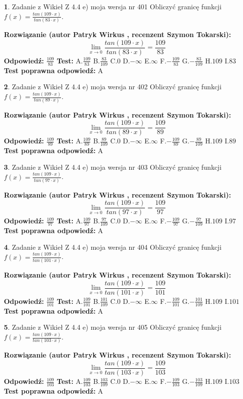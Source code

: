 \documentclass[12pt, a4paper]{article}
\theoremstyle{definition} %
\newtheorem{zad}{}
\newcommand{\zadStart}[1]{\begin{zad}#1\newline}
\newcommand{\zadStop}{\end{zad}}
\newcommand{\rozwStart}[2]{\noindent \textbf{Rozwiązanie (autor #1 , recenzent #2): }\newline}
\newcommand{\rozwStop}{\newline}
\newcommand{\odpStart}{\noindent \textbf{Odpowiedź:}\newline}
\newcommand{\odpStop}{\newline}
\newcommand{\testStart}{\noindent \textbf{Test:}\newline}
\newcommand{\testStop}{\newline}
\newcommand{\kluczStart}{\noindent \textbf{Test poprawna odpowiedź:}\newline}
\newcommand{\kluczStop}{\newline}
\begin{document}
\zadStart{Zadanie z Wikieł Z 4.4 e) moja wersja nr 401}
Obliczyć granicę funkcji $f(x)=\frac{tan(109\cdot x)}{tan(83\cdot x)}$.
\zadStop
\rozwStart{Patryk Wirkus}{Szymon Tokarski}
$$\lim\limits_{x\to 0}\frac{tan(109\cdot x)}{tan(83\cdot x)}=
\frac{109}{83}$$
\rozwStop
\odpStart
$\frac{109}{83}$
\odpStop
\testStart
A.$\frac{109}{83}$
B.$\frac{83}{109}$
C.$0$
D.$-\infty$
E.$\infty$
F.$-\frac{109}{83}$
G.$-\frac{83}{109}$
H.$109$
I.$83$
\testStop
\kluczStart
A
\kluczStop



\zadStart{Zadanie z Wikieł Z 4.4 e) moja wersja nr 402}
Obliczyć granicę funkcji $f(x)=\frac{tan(109\cdot x)}{tan(89\cdot x)}$.
\zadStop
\rozwStart{Patryk Wirkus}{Szymon Tokarski}
$$\lim\limits_{x\to 0}\frac{tan(109\cdot x)}{tan(89\cdot x)}=
\frac{109}{89}$$
\rozwStop
\odpStart
$\frac{109}{89}$
\odpStop
\testStart
A.$\frac{109}{89}$
B.$\frac{89}{109}$
C.$0$
D.$-\infty$
E.$\infty$
F.$-\frac{109}{89}$
G.$-\frac{89}{109}$
H.$109$
I.$89$
\testStop
\kluczStart
A
\kluczStop



\zadStart{Zadanie z Wikieł Z 4.4 e) moja wersja nr 403}
Obliczyć granicę funkcji $f(x)=\frac{tan(109\cdot x)}{tan(97\cdot x)}$.
\zadStop
\rozwStart{Patryk Wirkus}{Szymon Tokarski}
$$\lim\limits_{x\to 0}\frac{tan(109\cdot x)}{tan(97\cdot x)}=
\frac{109}{97}$$
\rozwStop
\odpStart
$\frac{109}{97}$
\odpStop
\testStart
A.$\frac{109}{97}$
B.$\frac{97}{109}$
C.$0$
D.$-\infty$
E.$\infty$
F.$-\frac{109}{97}$
G.$-\frac{97}{109}$
H.$109$
I.$97$
\testStop
\kluczStart
A
\kluczStop



\zadStart{Zadanie z Wikieł Z 4.4 e) moja wersja nr 404}
Obliczyć granicę funkcji $f(x)=\frac{tan(109\cdot x)}{tan(101\cdot x)}$.
\zadStop
\rozwStart{Patryk Wirkus}{Szymon Tokarski}
$$\lim\limits_{x\to 0}\frac{tan(109\cdot x)}{tan(101\cdot x)}=
\frac{109}{101}$$
\rozwStop
\odpStart
$\frac{109}{101}$
\odpStop
\testStart
A.$\frac{109}{101}$
B.$\frac{101}{109}$
C.$0$
D.$-\infty$
E.$\infty$
F.$-\frac{109}{101}$
G.$-\frac{101}{109}$
H.$109$
I.$101$
\testStop
\kluczStart
A
\kluczStop



\zadStart{Zadanie z Wikieł Z 4.4 e) moja wersja nr 405}
Obliczyć granicę funkcji $f(x)=\frac{tan(109\cdot x)}{tan(103\cdot x)}$.
\zadStop
\rozwStart{Patryk Wirkus}{Szymon Tokarski}
$$\lim\limits_{x\to 0}\frac{tan(109\cdot x)}{tan(103\cdot x)}=
\frac{109}{103}$$
\rozwStop
\odpStart
$\frac{109}{103}$
\odpStop
\testStart
A.$\frac{109}{103}$
B.$\frac{103}{109}$
C.$0$
D.$-\infty$
E.$\infty$
F.$-\frac{109}{103}$
G.$-\frac{103}{109}$
H.$109$
I.$103$
\testStop
\kluczStart
A
\kluczStop
\end{document}

